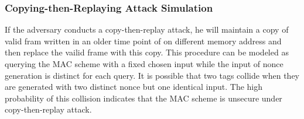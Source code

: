 \documentclass{article}
\begin{document}
\subsubsection{Copying-then-Replaying Attack Simulation}
If the adversary conducts a copy-then-replay attack, he will maintain a copy of valid fram written in an older time point of on different memory address and then replace the vailid frame with this copy. This procedure can be modeled as querying the MAC scheme with a fixed chosen input while the input of nonce generation is distinct for each query. It is possible that two tags collide when they are generated with two distinct nonce but one identical input. The high probability of this collision indicates that the MAC scheme is unsecure under copy-then-replay attack.  
\end{document}
